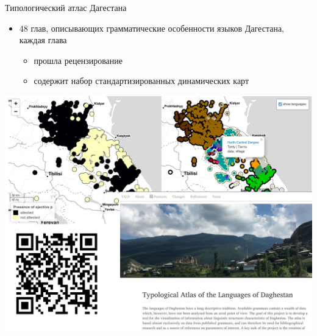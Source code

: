 \documentclass[
  13pt,
  ignorenonframetext,
]{beamer}
\providecommand{\tightlist}{%
  \setlength{\itemsep}{0pt}\setlength{\parskip}{0pt}}
\begin{document}
\begin{frame}{Типологический атлас Дагестана}
\protect\hypertarget{ux442ux438ux43fux43eux43bux43eux433ux438ux447ux435ux441ux43aux438ux439-ux430ux442ux43bux430ux441-ux434ux430ux433ux435ux441ux442ux430ux43dux430}{}
\begin{itemize}
\tightlist
\item
  48 глав, описывающих грамматические особенности языков Дагестана,
  каждая глава

  \begin{itemize}
  \tightlist
  \item
    прошла рецензирование
  \item
    содержит набор стандартизированных динамических карт
  \end{itemize}
\end{itemize}

\begin{center}\includegraphics[width=0.8\linewidth]{images/04_tald} \end{center}
\end{frame}
\end{document}
